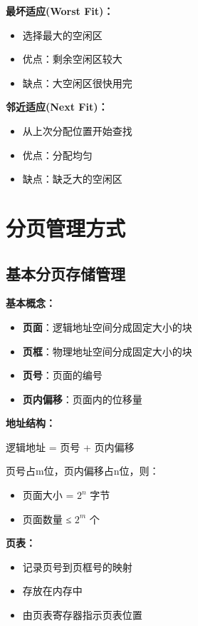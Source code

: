 \documentclass[lang=cn,newtx,10pt,scheme=chinese]{../../elegantbook}
\begin{document}
\textbf{最坏适应(Worst Fit)：}
\begin{itemize}
  \item 选择最大的空闲区
  \item 优点：剩余空闲区较大
  \item 缺点：大空闲区很快用完
\end{itemize}

\textbf{邻近适应(Next Fit)：}
\begin{itemize}
  \item 从上次分配位置开始查找
  \item 优点：分配均匀
  \item 缺点：缺乏大的空闲区
\end{itemize}

\section{分页管理方式}

\subsection{基本分页存储管理}

\textbf{基本概念：}
\begin{itemize}
  \item \textbf{页面}：逻辑地址空间分成固定大小的块
  \item \textbf{页框}：物理地址空间分成固定大小的块
  \item \textbf{页号}：页面的编号
  \item \textbf{页内偏移}：页面内的位移量
\end{itemize}

\textbf{地址结构：}
\begin{center}
逻辑地址 = 页号 + 页内偏移
\end{center}

页号占m位，页内偏移占n位，则：
\begin{itemize}
  \item 页面大小 = $2^n$ 字节
  \item 页面数量 ≤ $2^m$ 个
\end{itemize}

\textbf{页表：}
\begin{itemize}
  \item 记录页号到页框号的映射
  \item 存放在内存中
  \item 由页表寄存器指示页表位置
\end{itemize}
\end{document}
